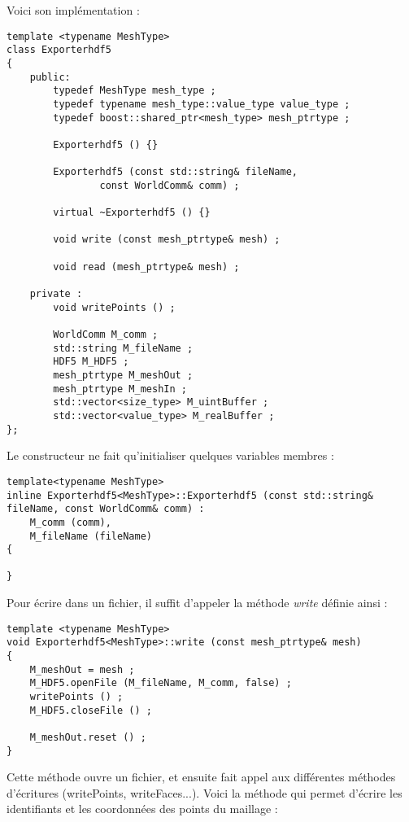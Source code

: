 \documentclass[12pt]{article}
\begin{document}
Voici son implémentation :
\begin{lstlisting}
template <typename MeshType>
class Exporterhdf5
{
    public: 
        typedef MeshType mesh_type ;
        typedef typename mesh_type::value_type value_type ;
        typedef boost::shared_ptr<mesh_type> mesh_ptrtype ;

        Exporterhdf5 () {} 

        Exporterhdf5 (const std::string& fileName,
                const WorldComm& comm) ;

        virtual ~Exporterhdf5 () {}   

        void write (const mesh_ptrtype& mesh) ;

        void read (mesh_ptrtype& mesh) ;

    private :
        void writePoints () ;

        WorldComm M_comm ;
        std::string M_fileName ;
        HDF5 M_HDF5 ;
        mesh_ptrtype M_meshOut ;
        mesh_ptrtype M_meshIn ;
        std::vector<size_type> M_uintBuffer ;
        std::vector<value_type> M_realBuffer ;
};
\end{lstlisting}
Le constructeur ne fait qu'initialiser quelques variables membres :
\begin{lstlisting}
template<typename MeshType>
inline Exporterhdf5<MeshType>::Exporterhdf5 (const std::string& fileName, const WorldComm& comm) :
    M_comm (comm),
    M_fileName (fileName)
{

}
\end{lstlisting}
Pour écrire dans un fichier, il suffit d'appeler la méthode \emph{write} définie ainsi :
\begin{lstlisting}
template <typename MeshType>
void Exporterhdf5<MeshType>::write (const mesh_ptrtype& mesh)
{
    M_meshOut = mesh ;
    M_HDF5.openFile (M_fileName, M_comm, false) ;
    writePoints () ;
    M_HDF5.closeFile () ;

    M_meshOut.reset () ;
}
\end{lstlisting}
Cette méthode ouvre un fichier, et ensuite fait appel aux différentes méthodes d'écritures (writePoints, writeFaces...). \newline
Voici la méthode qui permet d'écrire les identifiants et les coordonnées des points du maillage :
\end{document}
